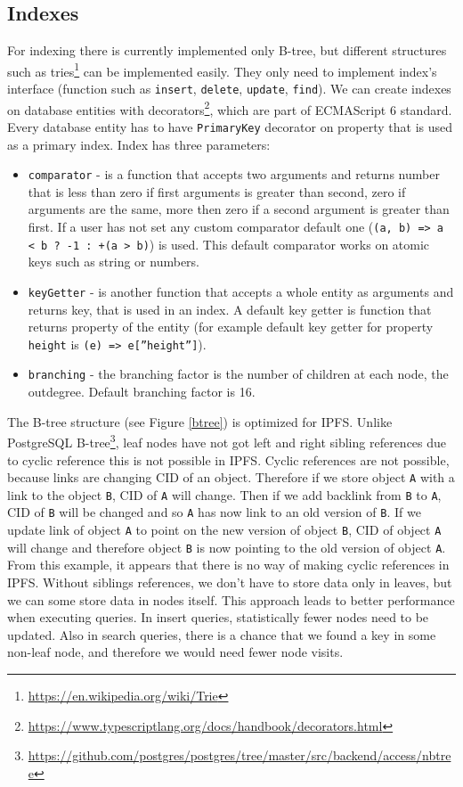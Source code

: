 \subsection{Indexes}
For indexing there is currently implemented only B-tree, but different structures such as tries\footnote{\url{https://en.wikipedia.org/wiki/Trie}} can be implemented easily. They only need to implement index's interface (function such as \texttt{insert}, \texttt{delete}, \texttt{update}, \texttt{find}). We can create indexes on database entities with decorators\footnote{\url{https://www.typescriptlang.org/docs/handbook/decorators.html}}, which are part of ECMAScript 6 standard. Every database entity has to have \texttt{PrimaryKey} decorator on property that is used as a primary index. Index has three parameters:
\begin{itemize}
    \item \texttt{comparator} - is a function that accepts two arguments and returns number that is less than zero if first arguments is greater than second, zero if arguments are the same, more then zero if a second argument is greater than first. If a user has not set any custom comparator default one (\texttt{(a, b) =>
    a < b ? -1 : +(a > b)}) is used. This default comparator works on atomic keys such as string or numbers. 
    \item \texttt{keyGetter} - is another function that accepts a whole entity as arguments and returns key, that is used in an index. A default key getter is function that returns property of the entity (for example default key getter for property \texttt{height} is \texttt{(e) =>  e[''height'']}).
    \item \texttt{branching} - the branching factor is the number of children at each node, the outdegree. Default branching factor is 16.
\end{itemize}

The B-tree structure (see Figure \ref{btree}) is optimized for IPFS. Unlike PostgreSQL B-tree\footnote{\url{https://github.com/postgres/postgres/tree/master/src/backend/access/nbtree}}, leaf nodes have not got left and right sibling references due to cyclic reference this is not possible in IPFS. Cyclic references are not possible, because links are changing CID of an object. Therefore if we store object \texttt{A} with a link to the object \texttt{B}, CID of \texttt{A} will change. Then if we add backlink from \texttt{B} to \texttt{A}, CID of \texttt{B} will be changed and so \texttt{A} has now link to an old version of \texttt{B}. If we update link of object \texttt{A} to point on the new version of object \texttt{B}, CID of object \texttt{A} will change and therefore object \texttt{B} is now pointing to the old version of object \texttt{A}. From this example, it appears that there is no way of making cyclic references in IPFS. Without siblings references, we don't have to store data only in leaves, but we can some store data in nodes itself. This approach leads to better performance when executing queries. In insert queries, statistically fewer nodes need to be updated. Also in search queries, there is a chance that we found a key in some non-leaf node, and therefore we would need fewer node visits.

